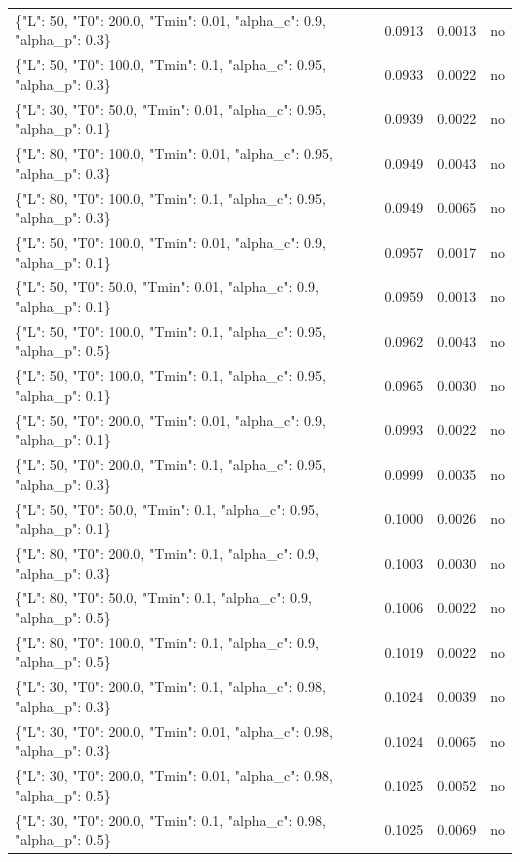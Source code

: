 \begin{table}[htbp]
\begin{tabular}{lrrr}
\{"L": 50, "T0": 200.0, "Tmin": 0.01, "alpha\_c": 0.9, "alpha\_p": 0.3\} & 0.0913 & 0.0013 & no \\
\{"L": 50, "T0": 100.0, "Tmin": 0.1, "alpha\_c": 0.95, "alpha\_p": 0.3\} & 0.0933 & 0.0022 & no \\
\{"L": 30, "T0": 50.0, "Tmin": 0.01, "alpha\_c": 0.95, "alpha\_p": 0.1\} & 0.0939 & 0.0022 & no \\
\{"L": 80, "T0": 100.0, "Tmin": 0.01, "alpha\_c": 0.95, "alpha\_p": 0.3\} & 0.0949 & 0.0043 & no \\
\{"L": 80, "T0": 100.0, "Tmin": 0.1, "alpha\_c": 0.95, "alpha\_p": 0.3\} & 0.0949 & 0.0065 & no \\
\{"L": 50, "T0": 100.0, "Tmin": 0.01, "alpha\_c": 0.9, "alpha\_p": 0.1\} & 0.0957 & 0.0017 & no \\
\{"L": 50, "T0": 50.0, "Tmin": 0.01, "alpha\_c": 0.9, "alpha\_p": 0.1\} & 0.0959 & 0.0013 & no \\
\{"L": 50, "T0": 100.0, "Tmin": 0.1, "alpha\_c": 0.95, "alpha\_p": 0.5\} & 0.0962 & 0.0043 & no \\
\{"L": 50, "T0": 100.0, "Tmin": 0.1, "alpha\_c": 0.95, "alpha\_p": 0.1\} & 0.0965 & 0.0030 & no \\
\{"L": 50, "T0": 200.0, "Tmin": 0.01, "alpha\_c": 0.9, "alpha\_p": 0.1\} & 0.0993 & 0.0022 & no \\
\{"L": 50, "T0": 200.0, "Tmin": 0.1, "alpha\_c": 0.95, "alpha\_p": 0.3\} & 0.0999 & 0.0035 & no \\
\{"L": 50, "T0": 50.0, "Tmin": 0.1, "alpha\_c": 0.95, "alpha\_p": 0.1\} & 0.1000 & 0.0026 & no \\
\{"L": 80, "T0": 200.0, "Tmin": 0.1, "alpha\_c": 0.9, "alpha\_p": 0.3\} & 0.1003 & 0.0030 & no \\
\{"L": 80, "T0": 50.0, "Tmin": 0.1, "alpha\_c": 0.9, "alpha\_p": 0.5\} & 0.1006 & 0.0022 & no \\
\{"L": 80, "T0": 100.0, "Tmin": 0.1, "alpha\_c": 0.9, "alpha\_p": 0.5\} & 0.1019 & 0.0022 & no \\
\{"L": 30, "T0": 200.0, "Tmin": 0.1, "alpha\_c": 0.98, "alpha\_p": 0.3\} & 0.1024 & 0.0039 & no \\
\{"L": 30, "T0": 200.0, "Tmin": 0.01, "alpha\_c": 0.98, "alpha\_p": 0.3\} & 0.1024 & 0.0065 & no \\
\{"L": 30, "T0": 200.0, "Tmin": 0.01, "alpha\_c": 0.98, "alpha\_p": 0.5\} & 0.1025 & 0.0052 & no \\
\{"L": 30, "T0": 200.0, "Tmin": 0.1, "alpha\_c": 0.98, "alpha\_p": 0.5\} & 0.1025 & 0.0069 & no \\

\end{tabular}
\end{table}
